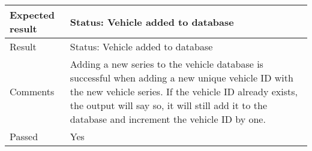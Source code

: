 \begin{table}[H]
\begin{tabularx}{1.0\textwidth}{
    |p{}     %
    |p{}|    %
}
Expected result
& Status: Vehicle added to database
\\
\hline

Result
& Status: Vehicle added to database
\\
\hline

Comments
& Adding a new series to the vehicle database is successful when adding a new unique vehicle ID with the new vehicle series. If the vehicle ID already exists, the output will say so, it will still add it to the database and increment the vehicle ID by one.
\\
\hline

Passed
& Yes
\\
\hline

\end{tabularx}
\end{table}


